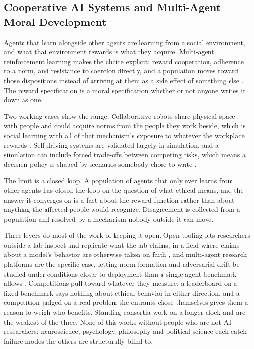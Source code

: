\subsection{Cooperative AI Systems and Multi-Agent Moral Development}
\label{sec:5.5.1}
Agents that learn alongside other agents are learning from a social environment, and what that environment rewards is what they acquire. Multi-agent reinforcement learning makes the choice explicit: reward cooperation, adherence to a norm, and resistance to coercion directly, and a population moves toward those dispositions instead of arriving at them as a side effect of something else \autocite{leibo2017sequential}. The reward specification is a moral specification whether or not anyone writes it down as one.

Two working cases show the range. Collaborative robots share physical space with people and could acquire norms from the people they work beside, which is social learning with all of that mechanism's exposure to whatever the workplace rewards \autocite{colgate1996cobots}. Self-driving systems are validated largely in simulation, and a simulation can include forced trade-offs between competing risks, which means a decision policy is shaped by scenarios somebody chose to write \autocite{behzadan2019trolleymod}.

The limit is a closed loop. A population of agents that only ever learns from other agents has closed the loop on the question of what ethical means, and the answer it converges on is a fact about the reward function rather than about anything the affected people would recognize. Disagreement is collected from a population and resolved by a mechanism nobody outside it can move.

Three levers do most of the work of keeping it open. Open tooling lets researchers outside a lab inspect and replicate what the lab claims, in a field where claims about a model's behavior are otherwise taken on faith \autocite{wolf2020transformers}, and multi-agent research platforms are the specific case, letting norm formation and adversarial drift be studied under conditions closer to deployment than a single-agent benchmark allows \autocite{leibo2021meltingpot}. Competitions pull toward whatever they measure: a leaderboard on a fixed benchmark says nothing about ethical behavior in either direction, and a competition judged on a real problem the entrants chose themselves gives them a reason to weigh who benefits. Standing consortia work on a longer clock and are the weakest of the three. None of this works without people who are not AI researchers: neuroscience, psychology, philosophy and political science each catch failure modes the others are structurally blind to.
